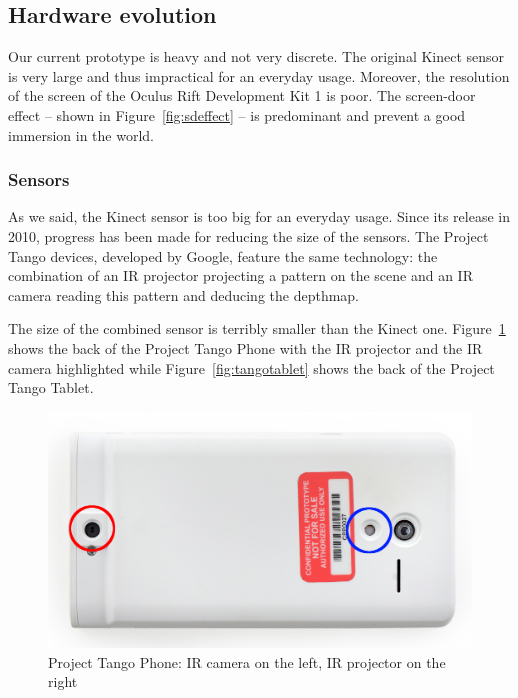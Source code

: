 \documentclass[12pt]{article}
\begin{document}
\subsection{Hardware evolution}
Our current prototype is heavy and not very discrete. The original Kinect sensor is very large and thus impractical for an everyday usage. Moreover, the resolution of the screen of the Oculus Rift Development Kit 1 is poor. The screen-door effect -- shown in Figure~\ref{fig:sdeffect} -- is predominant and prevent a good immersion in the world.
\subsubsection{Sensors}
As we said, the Kinect sensor is too big for an everyday usage. Since its release in 2010, progress has been made for reducing the size of the sensors. The Project Tango devices, developed by Google, feature the same technology: the combination of an IR projector projecting a pattern on the scene and an IR camera reading this pattern and deducing the depthmap.

The size of the combined sensor is terribly smaller than the Kinect one. Figure~\ref{fig:tangophone} shows the back of the Project Tango Phone with the IR projector and the IR camera highlighted while Figure~\ref{fig:tangotablet} shows the back of the Project Tango Tablet.

\begin{figure}[!h]
  \centering
  \includegraphics[scale=0.1]{TangoPhone.jpeg}
  \caption{\label{fig:tangophone} Project Tango Phone: IR camera on the left, IR projector on the right}
\end{figure}
\end{document}
